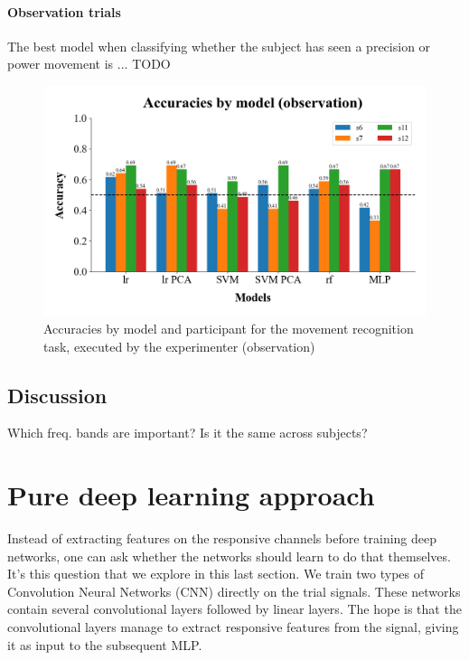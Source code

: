 \documentclass[10pt,conference,compsocconf]{IEEEtran}
\begin{document}
\paragraph{Observation trials}
The best model when classifying whether the subject has seen a precision or power movement is ... TODO

\begin{figure}[h!]
  \center
  \includegraphics[width=\linewidth]{../figures/accuracies_across_part_obs.png}
  \caption{Accuracies by model and participant for the movement recognition task, executed by the experimenter (observation)}
\end{figure}
\FloatBarrier

\subsection{Discussion}
Which freq. bands are important? Is it the same across subjects?

\section{Pure deep learning approach}
\label{sec:deeplearning}
Instead of extracting features on the responsive channels before training deep networks, one can ask whether the networks should learn to do that themselves. It's this question that we explore in this last section. We train two types of Convolution Neural Networks (CNN) directly on the trial signals. These networks contain several convolutional layers followed by linear layers. The hope is that the convolutional layers manage to extract responsive features from the signal, giving it as input to the subsequent MLP.
\end{document}
